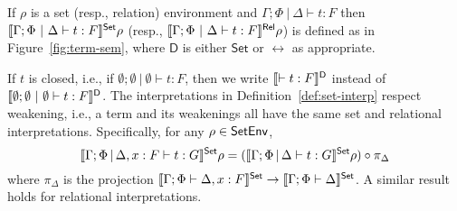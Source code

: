 \documentclass{lmcs}
\theoremstyle{plain}\newtheorem{satz}[thm]{Satz}
\newcommand{\set}{\mathsf{Set}}
\begin{document}
{\begin{defi}\label{def:set-interp}
If $\rho$ is a set (resp., relation) environment and
$\Gamma;\Phi~|~\Delta \vdash t : F$ then
$\setsem{\Gamma;\Phi~|~\Delta \vdash t : F}\rho$ (resp.,
$\llbracket{\Gamma;\Phi~|~\Delta \vdash t : F}\rrbracket^{\mathsf{Rel}}\rho$) is defined as in
Figure~\ref{fig:term-sem}, where $\mathsf D$ is either $\set$ or
$\rel$ as appropriate.
\end{defi}

If $t$ is closed, i.e., if $\emptyset; \emptyset~|~\emptyset \vdash t
: F$, then we write $\llbracket{\vdash t : F}\rrbracket^{\mathsf D}$ instead of $\llbracket{\emptyset;
  \emptyset~|~\emptyset \vdash t : F}\rrbracket^{\mathsf D}$.  The interpretations in
Definition~\ref{def:set-interp} respect weakening, i.e., a term and
its weakenings all have the same set and relational
interpretations. Specifically, for any $\rho \in \mathsf{SetEnv}$,
\[\setsem{\Gamma;\Phi \,|\, \Delta, x : F \vdash t : G}\rho =
(\setsem{\Gamma;\Phi \,|\, \Delta \vdash t : G}\rho) \circ
\pi_{\Delta}\] where $\pi_{\Delta}$ is the projection
$\setsem{\Gamma;\Phi \vdash \Delta, x : F} \to
\setsem{\Gamma;\Phi \vdash \Delta}$. A similar result holds for
relational interpretations.

}
\end{document}
